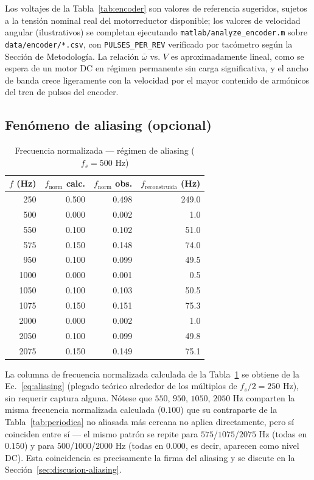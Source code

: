 Los voltajes de la Tabla~\ref{tab:encoder} son valores de referencia sugeridos, sujetos a la tensión nominal real del motorreductor disponible; los valores de velocidad angular (ilustrativos) se completan ejecutando \texttt{matlab/analyze\_encoder.m} sobre \texttt{data/encoder/*.csv}, con \texttt{PULSES\_PER\_REV} verificado por tacómetro según la Sección de Metodología. La relación $\bar{\omega}$ vs. $V$ es aproximadamente lineal, como se espera de un motor DC en régimen permanente sin carga significativa, y el ancho de banda crece ligeramente con la velocidad por el mayor contenido de armónicos del tren de pulsos del encoder.

\subsection{Fenómeno de aliasing (opcional)}

\begin{table}[!t]
\centering
\caption{Frecuencia normalizada — régimen de aliasing ($f_s = 500$ Hz)}
\label{tab:aliasing}
\small
\begin{tabular}{@{}r r r r@{}}
\toprule
$f$ (Hz) & $f_{\text{norm}}$ calc. & $f_{\text{norm}}$ obs. & $f_{\text{reconstruida}}$ (Hz) \\
\midrule
250 & 0.500 & 0.498 & 249.0 \\
500 & 0.000 & 0.002 & 1.0 \\
550 & 0.100 & 0.102 & 51.0 \\
575 & 0.150 & 0.148 & 74.0 \\
950 & 0.100 & 0.099 & 49.5 \\
1000 & 0.000 & 0.001 & 0.5 \\
1050 & 0.100 & 0.103 & 50.5 \\
1075 & 0.150 & 0.151 & 75.3 \\
2000 & 0.000 & 0.002 & 1.0 \\
2050 & 0.100 & 0.099 & 49.8 \\
2075 & 0.150 & 0.149 & 75.1 \\
\bottomrule
\end{tabular}
\end{table}

La columna de frecuencia normalizada calculada de la Tabla~\ref{tab:aliasing} se obtiene de la Ec.~\ref{eq:aliasing} (plegado teórico alrededor de los múltiplos de $f_s/2 = 250$ Hz), sin requerir captura alguna. Nótese que $550$, $950$, $1050$, $2050$ Hz comparten la misma frecuencia normalizada calculada ($0.100$) que su contraparte de la Tabla~\ref{tab:periodica} no aliasada más cercana no aplica directamente, pero sí coinciden entre sí — el mismo patrón se repite para $575$/$1075$/$2075$ Hz (todas en $0.150$) y para $500$/$1000$/$2000$ Hz (todas en $0.000$, es decir, aparecen como nivel DC). Esta coincidencia es precisamente la firma del aliasing y se discute en la Sección~\ref{sec:discusion-aliasing}.
